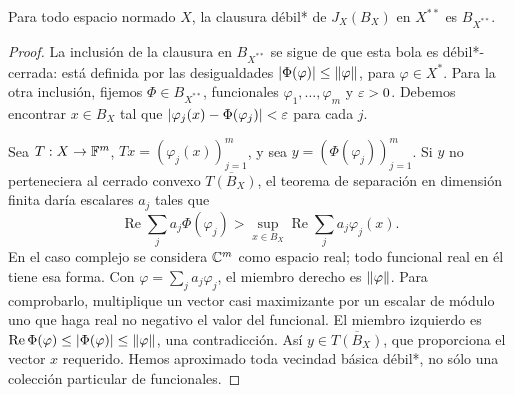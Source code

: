 \begin{teorema}[Goldstine]\label{v3:goldstine}
Para todo espacio normado $X$, la clausura débil* de $J_X(B_X)$ en $X^{**}$ es $B_{X^{**}}$.
\end{teorema}
\begin{proof}
La inclusión de la clausura en $B_{X^{**}}$ se sigue de que esta bola es débil*-cerrada: está definida por las desigualdades $|\Phi(\varphi)|\leq\left\lVert\varphi\right\rVert$, para $\varphi\in X^*$. Para la otra inclusión, fijemos $\Phi\in B_{X^{**}}$, funcionales $\varphi_1,\ldots,\varphi_m$ y $\varepsilon>0$. Debemos encontrar $x\in B_X$ tal que $|\varphi_j(x)-\Phi(\varphi_j)|<\varepsilon$ para cada $j$.

Sea $T:X\to\mathbb F^m$, $Tx=(\varphi_j(x))_{j=1}^m$, y sea $y=(\Phi(\varphi_j))_{j=1}^m$. Si $y$ no perteneciera al cerrado convexo $\overline{T(B_X)}$, el teorema de separación en dimensión finita daría escalares $a_j$ tales que
\[
 \operatorname{Re}\sum_j a_j\Phi(\varphi_j)
 >\sup_{x\in B_X}\operatorname{Re}\sum_j a_j\varphi_j(x).
\]
En el caso complejo se considera $\mathbb C^m$ como espacio real; todo funcional real en él tiene esa forma. Con $\varphi=\sum_j a_j\varphi_j$, el miembro derecho es $\left\lVert\varphi\right\rVert$. Para comprobarlo, multiplique un vector casi maximizante por un escalar de módulo uno que haga real no negativo el valor del funcional. El miembro izquierdo es $\operatorname{Re}\Phi(\varphi)\leq|\Phi(\varphi)|\leq\left\lVert\varphi\right\rVert$, una contradicción. Así $y\in\overline{T(B_X)}$, que proporciona el vector $x$ requerido. Hemos aproximado toda vecindad básica débil*, no sólo una colección particular de funcionales.
\end{proof}

